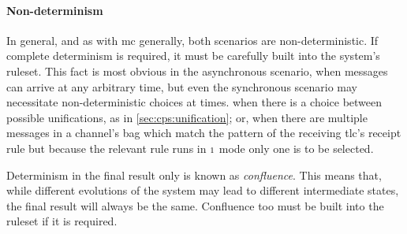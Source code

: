 \paragraph{Non-determinism}
In general, and as with \gls{mc} generally, both scenarios are non-deterministic.  If complete determinism is required, it must be carefully built into the system's \gls{ruleset}.  This fact is most obvious in the asynchronous scenario, when messages can arrive at any arbitrary time, but even the synchronous scenario may necessitate non-deterministic choices at times. \Eg{} when there is a choice between possible
unifications, as in \cref{sec:cps:unification}; or, when there are multiple messages in a channel’s bag
which match the pattern of the receiving \gls{tlc}’s receipt rule but because the relevant rule runs in \({\scriptstyle 1}\) mode only one is to be selected.

Determinism in the final result only is known as \emph{confluence}.  This means that, while different evolutions of the system may lead to different intermediate states, the final result will always be the same.  Confluence too must be built into the \gls{ruleset} if it is required.